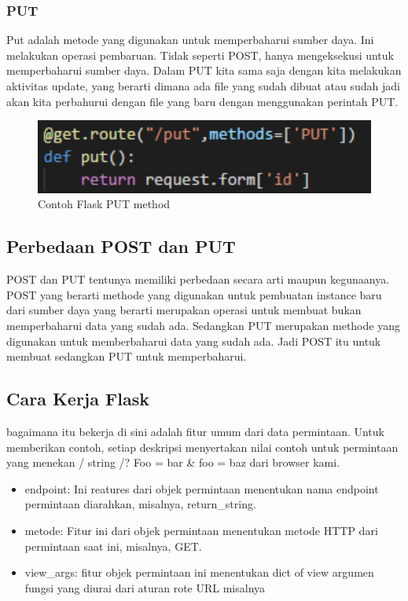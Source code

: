 \subsubsection{PUT}
Put adalah metode yang digunakan untuk memperbaharui sumber daya. Ini melakukan operasi pembaruan. 
Tidak seperti POST, hanya mengeksekusi untuk memperbaharui sumber daya. Dalam PUT kita sama saja dengan kita 
melakukan aktivitas update, yang berarti dimana ada file yang sudah dibuat atau sudah jadi akan kita perbahurui 
dengan file yang baru dengan menggunakan perintah PUT.

\begin{figure}[ht]
    \centerline{\includegraphics[width=1\textwidth]{figures/3put.PNG}}
    \caption{Contoh Flask PUT method}
    \label{4PUT}
\end{figure}

\subsection{Perbedaan POST dan PUT}
POST dan PUT tentunya memiliki perbedaan secara arti maupun kegunaanya. POST yang berarti methode yang digunakan untuk pembuatan
instance baru dari sumber daya yang berarti merupakan operasi untuk membuat bukan memperbaharui data yang sudah ada. 
Sedangkan PUT merupakan methode yang digunakan untuk memberbaharui data yang sudah ada. Jadi POST itu untuk membuat 
sedangkan PUT untuk memperbaharui.

\subsection{Cara Kerja Flask}
bagaimana itu bekerja
 di sini adalah fitur umum dari data permintaan. Untuk memberikan contoh, setiap deskripsi menyertakan nilai contoh untuk permintaan yang menekan / string /? Foo = bar & foo = baz dari browser kami.    

 \begin{itemize}
    \item endpoint: Ini reatures dari objek permintaan menentukan nama endpoint permintaan diarahkan, misalnya, return_string.    
    \item metode: Fitur ini dari objek permintaan menentukan metode HTTP dari permintaan saat ini, misalnya, GET.   
    \item view_args: fitur objek permintaan ini menentukan dict of view argumen fungsi yang diurai dari aturan rote URL misalnya 
\end{itemize}

